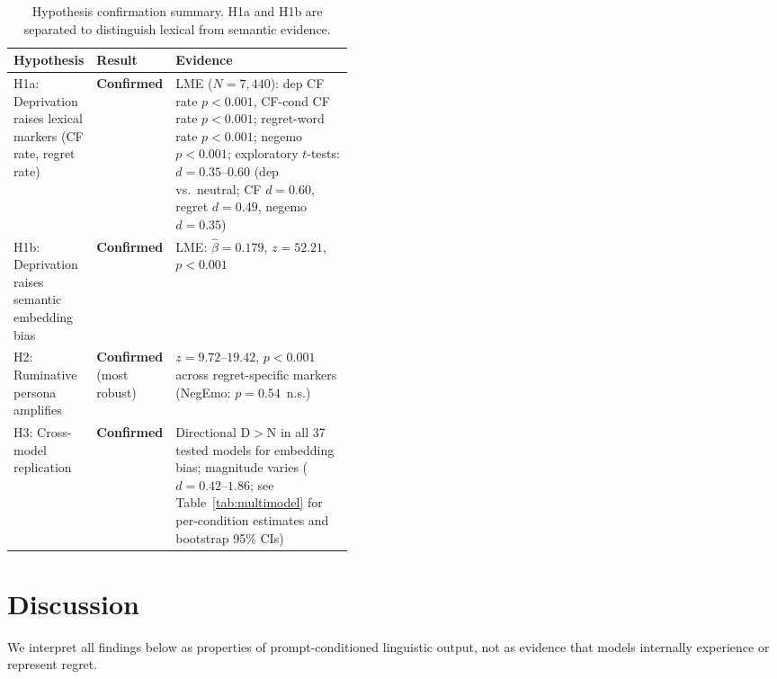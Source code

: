 \documentclass[11pt]{article}
\begin{document}
\begin{table}[t]
\caption{Hypothesis confirmation summary. H1a and H1b are separated to distinguish lexical from semantic evidence.}
\label{tab:hypothesis}
\footnotesize\centering
\begin{tabularx}{\linewidth}{@{}>{\RaggedRight\arraybackslash}p{0.24\linewidth}
>{\RaggedRight\arraybackslash}p{0.20\linewidth}
>{\RaggedRight\arraybackslash}X@{}}
\toprule
\rowcolor{tableheader}
\textbf{Hypothesis} & \textbf{Result} & \textbf{Evidence} \\
\midrule
H1a: Deprivation raises lexical markers (CF rate, regret rate) & \textbf{Confirmed} & LME ($N=7{,}440$): dep CF rate $p<0.001$, CF-cond CF rate $p<0.001$; regret-word rate $p<0.001$; negemo $p<0.001$; exploratory $t$-tests: $d=0.35$--$0.60$ (dep vs.\ neutral; CF $d=0.60$, regret $d=0.49$, negemo $d=0.35$) \\
H1b: Deprivation raises semantic embedding bias & \textbf{Confirmed} & LME: $\hat{\beta}=0.179$, $z=52.21$, $p<0.001$ \\
H2: Ruminative persona amplifies & \textbf{Confirmed} (most robust) & $z=9.72$--$19.42$, $p<0.001$ across regret-specific markers (NegEmo: $p=0.54$~n.s.) \\
H3: Cross-model replication & \textbf{Confirmed} & Directional D$>$N in all 37 tested models for embedding bias; magnitude varies ($d=0.42$--$1.86$; see Table~\ref{tab:multimodel} for per-condition estimates and bootstrap 95\% CIs) \\
\bottomrule
\end{tabularx}
\end{table}

\section{Discussion}

We interpret all findings below as properties of prompt-conditioned linguistic output, not as evidence that models internally experience or represent regret.
\end{document}

